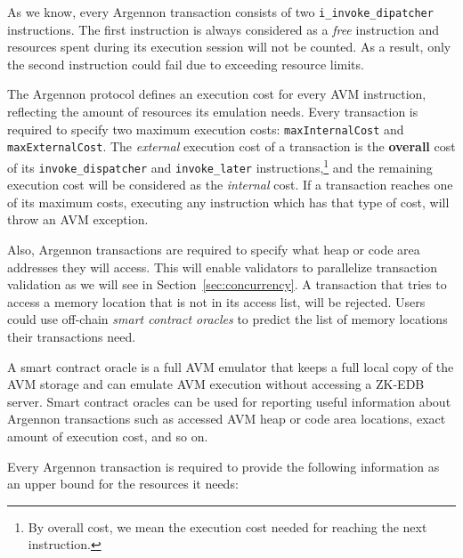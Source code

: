 As we know, every Argennon transaction consists of two \texttt{i\_invoke\_dipatcher} instructions. The first
instruction is always considered as a \emph{free} instruction and resources spent during its execution
session will not be counted. As a result, only the second instruction could fail due to exceeding resource limits.

The Argennon protocol defines an execution cost for
every AVM instruction, reflecting the amount of resources its emulation needs. Every
transaction is required to specify two maximum execution costs: \texttt{maxInternalCost}
and \texttt{maxExternalCost}. The \emph{external} execution cost of a transaction is the \textbf{overall} cost of its
\texttt{invoke\_dispatcher} and \texttt{invoke\_later} instructions,\footnote{By overall cost, we mean the execution
cost needed for reaching the next instruction.} and the remaining execution cost will be considered as
the \emph{internal} cost. If a transaction reaches one of its maximum costs, executing any instruction which has
that type of cost, will throw an AVM exception.


Also, Argennon transactions are required to specify what heap or code area addresses they will access. This will
enable validators to parallelize transaction validation as we will see in Section~\ref{sec:concurrency}. A transaction
that tries to access a memory location that is not in its access list, will be rejected.
Users could use off-chain \emph{smart contract oracles} to predict the list of memory locations their transactions need.

A smart contract oracle is a full AVM emulator that keeps a full local copy of the AVM storage and can emulate AVM
execution without accessing a ZK-EDB server. Smart contract oracles can be used for reporting useful information about
Argennon transactions such as accessed AVM heap or code area locations, exact amount of execution cost,
and so on.

Every Argennon transaction is required to provide the following information as an upper bound for the
resources it needs:

